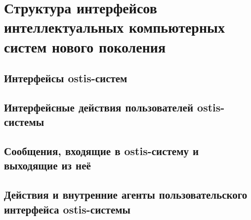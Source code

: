 \chapter{Структура интерфейсов интеллектуальных компьютерных систем нового поколения}
\label{chapter_interfaces}


\section{Интерфейсы ostis-систем}
\section{Интерфейсные действия пользователей ostis-системы}
\section{Сообщения, входящие в ostis-систему и выходящие из неё}
\section{Действия и внутренние агенты пользовательского интерфейса ostis-системы}

%